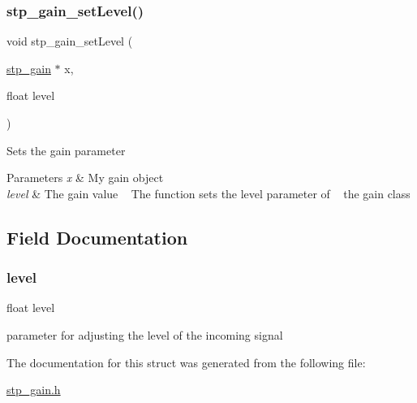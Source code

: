 \subsubsection{\texorpdfstring{stp\+\_\+gain\+\_\+set\+Level()}{stp\_gain\_setLevel()}}
{\footnotesize\ttfamily void stp\+\_\+gain\+\_\+set\+Level (\begin{DoxyParamCaption}\item[{\hyperlink{structstp__gain}{stp\+\_\+gain} $\ast$}]{x,  }\item[{float}]{level }\end{DoxyParamCaption})\hspace{0.3cm}{\ttfamily [related]}}



Sets the gain parameter ~\newline
 


\begin{DoxyParams}{Parameters}
{\em x} & My gain object ~\newline
 \\
\hline
{\em level} & The gain value ~\newline
 The function sets the level parameter of ~\newline
 the gain class \\
\hline
\end{DoxyParams}


\subsection{Field Documentation}
\mbox{\label{structstp__gain_a450c3ab9b94a4663caad892b7193b547}} 
\subsubsection{\texorpdfstring{level}{level}}
{\footnotesize\ttfamily float level}

parameter for adjusting the level of the incoming signal 

The documentation for this struct was generated from the following file\+:\begin{DoxyCompactItemize}
\item 
\hyperlink{stp__gain_8h}{stp\+\_\+gain.\+h}\end{DoxyCompactItemize}
